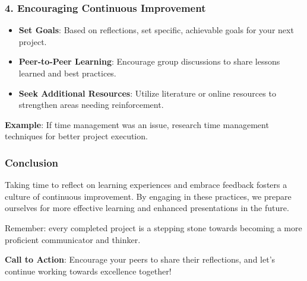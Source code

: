 \documentclass[aspectratio=169]{beamer}
\begin{document}
\begin{frame}[fragile]
    \frametitle{4. Encouraging Continuous Improvement}
    \begin{itemize}
        \item \textbf{Set Goals}: Based on reflections, set specific, achievable goals for your next project.
        \item \textbf{Peer-to-Peer Learning}: Encourage group discussions to share lessons learned and best practices.
        \item \textbf{Seek Additional Resources}: Utilize literature or online resources to strengthen areas needing reinforcement.
    \end{itemize}
    
    \textbf{Example}: If time management was an issue, research time management techniques for better project execution.
\end{frame}

\begin{frame}[fragile]
    \frametitle{Conclusion}
    Taking time to reflect on learning experiences and embrace feedback fosters a culture of continuous improvement. 
    By engaging in these practices, we prepare ourselves for more effective learning and enhanced presentations in the future.
    
    Remember: every completed project is a stepping stone towards becoming a more proficient communicator and thinker.
    
    \textbf{Call to Action}: Encourage your peers to share their reflections, and let’s continue working towards excellence together!
\end{frame}
\end{document}
